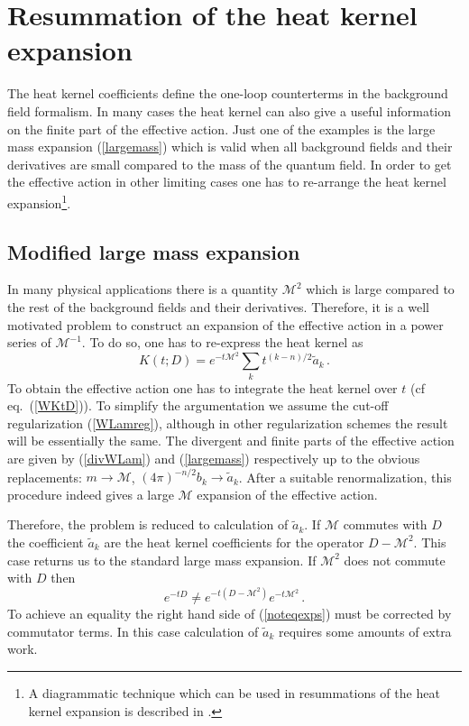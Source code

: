 \section{Resummation of the heat kernel expansion}\label{sec8}
The heat kernel coefficients define the one-loop counterterms
in the background field formalism. In many cases the heat kernel
can also give a useful information on the finite part of the
effective action. Just one of the examples is the large mass
expansion (\ref{largemass}) which is valid when all background
fields and their derivatives are small compared to the mass of
the quantum field. In order to get the effective action in other
limiting cases one has to re-arrange the heat kernel 
expansion\footnote{A diagrammatic technique which can be used in resummations
of the heat kernel expansion is described in \cite{Moss:1999wq}.}.
\subsection{Modified large mass expansion}\label{s8finite}
In many physical applications there is a quantity $\mathcal{M}^2$
which is large compared to the rest of the background fields
and their derivatives. Therefore, it is a well motivated problem
to construct an expansion of the effective action in a
power series of $\mathcal{M}^{-1}$. To do so, one has to re-express
the heat kernel as
\begin{equation}
K(t;D)=e^{-t\mathcal{M}^2} \sum_k t^{(k-n)/2} \tilde a_k \,.
\label{modifHK}
\end{equation}
To obtain the effective action one has to integrate the heat kernel
over $t$ (cf eq.\ (\ref{WKtD})). To simplify the argumentation
we assume the cut-off regularization (\ref{WLamreg}), although in other
regularization schemes the result will be essentially the same.
The divergent and finite parts of the effective action are given
by (\ref{divWLam}) and (\ref{largemass}) respectively up to the obvious
replacements: $m\to \mathcal{M}$, $(4\pi )^{-n/2}b_k \to \tilde a_k$.
After a suitable renormalization, this procedure indeed gives a large
$\mathcal{M}$ expansion of the effective action.

Therefore, the problem is reduced to calculation of 
$\tilde a_k$. If $\mathcal{M}$ commutes with $D$ the coefficient
$\tilde a_k$ are the heat kernel coefficients for
the operator $D-\mathcal{M}^2$. This case returns us to the
standard large mass expansion. If $\mathcal{M}^2$ does not commute
with $D$ then
\begin{equation}
e^{-tD}\ne e^{-t(D-\mathcal{M}^2)}e^{-t\mathcal{M}^2} \,.\label{noteqexps}
\end{equation}
To achieve an equality the right hand side of (\ref{noteqexps}) must
be corrected by commutator terms. In this case calculation of
$\tilde a_k$ requires some amounts of extra work.

